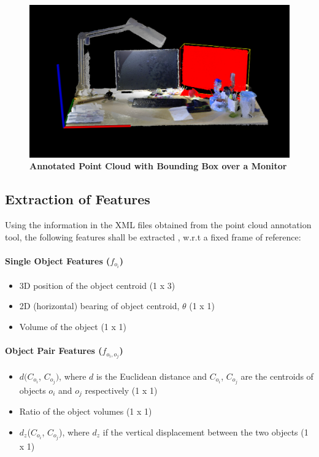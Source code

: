 \documentclass[12pt]{article}
\begin{document}
\begin{figure} [H]
\includegraphics[scale = 0.30]{pcl_annotated.png}
\centering
\caption{\textbf{Annotated Point Cloud with Bounding Box over a Monitor \cite{KTH Dataset}}} 
\end{figure}

\subsection{Extraction of Features}

Using the information in the XML files obtained from the point cloud annotation tool, the following features shall be extracted \cite{STRANDS}, w.r.t a fixed frame of reference:

\paragraph{Single Object Features ($f_{o_i}$)}

\begin{itemize}
\item{3D position of the object centroid  (1 x 3)}
\item{2D (horizontal) bearing of object centroid, $\theta$ (1 x 1)}
\item{Volume of the object (1 x 1)}
\end{itemize}

\paragraph{Object Pair Features ($f_{o_i, o_j}$)}

\begin{itemize}
\item{$d(C_{o_i}$, $C_{o_j})$, where $d$ is the Euclidean distance and $C_{o_i}$, $C_{o_j}$ are the centroids of objects $o_i$ and $o_j$ respectively (1 x 1)}
\item{Ratio of the object volumes (1 x 1)}
\item{$d_z$($C_{o_i}$, $C_{o_j}$), where $d_z$ if the vertical displacement between the two objects (1 x 1)}
\end{itemize}
\end{document}
